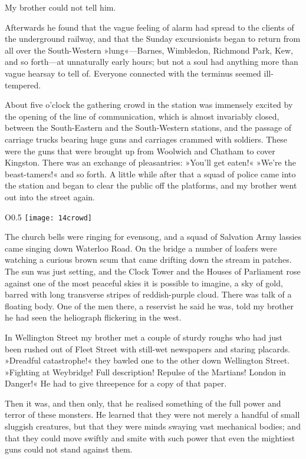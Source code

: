 My brother could not tell him.

Afterwards he found that the vague feeling of alarm had spread to the clients of the underground railway, and that the Sunday excursionists began to return from all over the South-Western »lung«—Barnes, Wimbledon, Richmond Park, Kew, and so forth—at unnaturally early hours; but not a soul had anything more than vague hearsay to tell of. Everyone connected with the terminus seemed ill-tempered.

About five o'clock the gathering crowd in the station was immensely excited by the opening of the line of communication, which is almost invariably closed, between the South-Eastern and the South-Western stations, and the passage of carriage trucks bearing huge guns and carriages crammed with soldiers. These were the guns that were brought up from Woolwich and Chatham to cover Kingston. There was an exchange of pleasantries: »You'll get eaten!« »We're the beast-tamers!« and so forth. A little while after that a squad of police came into the station and began to clear the public off the platforms, and my brother went out into the street again.

\begin{wrapfigure}{O}{0.5\textwidth}
\centering
\texttt{[image: 14crowd]}
\end{wrapfigure}

The church bells were ringing for evensong, and a squad of Salvation Army lassies came singing down Waterloo Road. On the bridge a number of loafers were watching a curious brown scum that came drifting down the stream in patches. The sun was just setting, and the Clock Tower and the Houses of Parliament rose against one of the most peaceful skies it is possible to imagine, a sky of gold, barred with long transverse stripes of reddish-purple cloud. There was talk of a floating body. One of the men there, a reservist he said he was, told my brother he had seen the heliograph flickering in the west.

In Wellington Street my brother met a couple of sturdy roughs who had just been rushed out of Fleet Street with still-wet newspapers and staring placards. \label{brojourney3} »Dreadful catastrophe!« they bawled one to the other down Wellington Street. »Fighting at Weybridge! Full description! Repulse of the Martians! London in Danger!« He had to give threepence for a copy of that paper.

Then it was, and then only, that he realised something of the full power and terror of these monsters. He learned that they were not merely a handful of small sluggish creatures, but that they were minds swaying vast mechanical bodies; and that they could move swiftly and smite with such power that even the mightiest guns could not stand against them.

